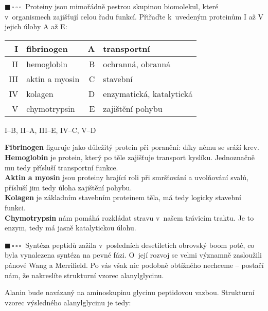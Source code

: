\documentclass{book}
\newcommand{\jeden}{$\blacksquare \, \square \, \square \, \square \; \; $}
\renewenvironment{quotation}{\par}{\par} %
\begin{document}
\hrulefill %
\begin{quotation}

\jeden Proteiny jsou mimořádně pestrou skupinou biomolekul, které v~organismech
zajišťují celou řadu funkcí. Přiřaďte k~uvedeným proteinům I až V
jejich úlohy A až E:
\noindent \begin{center}
\begin{tabular}{r|l||r|l}

I & fibrinogen & A & transportní\tabularnewline
\hline 
II & hemoglobin & B & ochranná, obranná\tabularnewline
\hline 
III & aktin a myosin & C & stavební\tabularnewline
\hline 
IV & kolagen & D & enzymatická, katalytická\tabularnewline
\hline 
V & chymotrypsin & E & zajištění pohybu\tabularnewline

\end{tabular}
\par\end{center}
\end{quotation}

I--B, II--A, III--E, IV--C, V--D

\textbf{Fibrinogen} figuruje jako důležitý protein při poranění: díky němu
se sráží krev.\\
\textbf{Hemoglobin} je protein, který po těle zajišťuje transport kyslíku.
Jednoznačně mu tedy přísluší transportní funkce.\\
\textbf{Aktin a myosin} jsou proteiny hrající roli při smršťování a uvolňování
svalů, přísluší jim tedy úloha zajištění pohybu.\\
\textbf{Kolagen} je základním stavebním proteinem těla, má tedy logicky stavební
funkci.\\
\textbf{Chymotrypsin} nám pomáhá rozkládat stravu v~našem trávicím traktu.
Je to enzym, tedy má jasně katalytickou úlohu.

\newpage %
\begin{quotation}
\jeden Syntéza peptidů zažila v~posledních desetiletích obrovský boom poté,
co byla vynalezena syntéza na pevné fázi. O~její rozvoj se velmi
významně zasloužili pánové Wang a Merrifield. Po vás však nic podobně
obtížného nechceme -- postačí nám, že nakreslíte strukturní vzorec
alanylglycinu.
\end{quotation} \dotfill \par 
\-Alanin bude navázaný na aminoskupinu glycinu peptidovou vazbou. Strukturní vzorec výsledného alanylglycinu je tedy:
\end{document}
